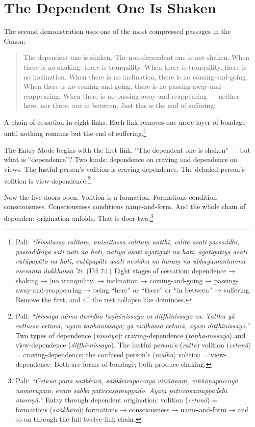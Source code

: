\section*{The Dependent One Is Shaken}

The second demonstration uses one of the most compressed passages in the Canon:

\begin{quote}
The dependent one is shaken. The non-dependent one is not shaken. When there is no shaking, there is tranquility. When there is tranquility, there is no inclination. When there is no inclination, there is no coming-and-going. When there is no coming-and-going, there is no passing-away-and-reappearing. When there is no passing-away-and-reappearing --- neither here, nor there, nor in between. Just this is the end of suffering.
\end{quote}

A chain of cessation in eight links. Each link removes one more layer of bondage until nothing remains but the end of suffering.\footnote{Pali: \textit{``Nissitassa calitaṃ, anissitassa calitaṃ natthi, calite asati passaddhi, passaddhiyā sati nati na hoti, natiyā asati āgatigati na hoti, āgatigatiyā asati cutūpapāto na hoti, cutūpapāte asati nevidha na huraṃ na ubhayamantarena esevanto dukkhassā\,''ti.} (Ud 74.) Eight stages of cessation: dependence → shaking → [no tranquility] → inclination → coming-and-going → passing-away-and-reappearing → being ``here'' or ``there'' or ``in between'' → suffering. Remove the first, and all the rest collapse like dominoes.}

The Entry Mode begins with the first link. ``The dependent one is shaken'' --- but what is ``dependence''? Two kinds: dependence on craving and dependence on views. The lustful person's volition is craving-dependence. The deluded person's volition is view-dependence.\footnote{Pali: \textit{``Nissayo nāma duvidho taṇhānissayo ca diṭṭhinissayo ca. Tattha yā rattassa cetanā, ayaṃ taṇhānissayo; yā mūḷhassa cetanā, ayaṃ diṭṭhinissayo.''} Two types of dependence (\textit{nissaya}): craving-dependence (\textit{taṇhā-nissaya}) and view-dependence (\textit{diṭṭhi-nissaya}). The lustful person's (\textit{ratta}) volition (\textit{cetanā}) = craving-dependence; the confused person's (\textit{mūḷha}) volition = view-dependence. Both are forms of bondage; both produce shaking.}

Now the five doors open. Volition is a formation. Formations condition consciousness. Consciousness conditions name-and-form. And the whole chain of dependent origination unfolds. That is door two.\footnote{Pali: \textit{``Cetanā pana saṅkhārā, saṅkhārapaccayā viññāṇaṃ, viññāṇapaccayā nāmarūpaṃ, evaṃ sabbo paṭiccasamuppādo. Ayaṃ paṭiccasamuppādehi otaraṇā.''} Entry through dependent origination: volition (\textit{cetanā}) = formations (\textit{saṅkhārā}); formations → consciousness → name-and-form → and so on through the full twelve-link chain.}

